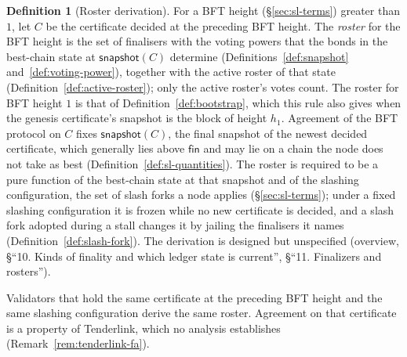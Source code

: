 \documentclass[11pt,a4paper]{article}
\theoremstyle{definition}
\newtheorem{definition}[theorem]{Definition}
\newcommand{\snapshot}{\mathsf{snapshot}}
\newcommand{\fin}{\mathsf{fin}}
\begin{document}
\begin{definition}[Roster derivation]\label{def:roster}
For a BFT height (\S\ref{sec:sl-terms}) greater than $1$, let $C$ be the
certificate decided at the preceding BFT height. The \emph{roster} for the
BFT height is the set of finalisers with the voting powers that the bonds in
the best-chain state at $\snapshot(C)$ determine (Definitions~\ref{def:snapshot}
and~\ref{def:voting-power}), together with the active roster of that state
(Definition~\ref{def:active-roster}); only the active roster's votes count. The
roster for BFT height $1$ is that of Definition~\ref{def:bootstrap}, which this
rule also gives when the genesis certificate's snapshot is the block of height
$h_1$. Agreement of the BFT protocol on $C$ fixes $\snapshot(C)$, the final
snapshot of the newest decided certificate, which generally lies above $\fin$
and may lie on a chain the node does not take as best
(Definition~\ref{def:sl-quantities}). The roster is required to be a pure
function of the best-chain state at that snapshot and of the slashing
configuration, the set of slash forks a node applies (\S\ref{sec:sl-terms});
under a fixed slashing configuration it is frozen while no new certificate is
decided, and a slash fork adopted during a stall changes it by jailing the
finalisers it names (Definition~\ref{def:slash-fork}). The derivation is
designed but unspecified (overview, \S``10. Kinds of finality and which
ledger state is current'', \S``11. Finalizers and rosters'').
\end{definition}

Validators that hold the same certificate at the preceding BFT height and
the same slashing configuration derive the same roster. Agreement on that
certificate is a property of Tenderlink, which no analysis establishes
(Remark~\ref{rem:tenderlink-fa}).
\end{document}
